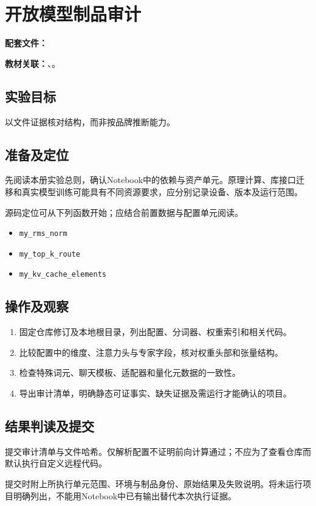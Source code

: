 \chapter{开放模型制品审计}
\label{lab:E10_open_model}

\noindent\textbf{配套文件：}\par
\noindent\textbf{教材关联：}、。

\section*{实验目标}
以文件证据核对结构，而非按品牌推断能力。

\section*{准备及定位}
先阅读本册实验总则，确认Notebook中的依赖与资产单元。原理计算、库接口迁移和真实模型训练可能具有不同资源要求，应分别记录设备、版本及运行范围。

源码定位可从下列函数开始；应结合前置数据与配置单元阅读。
\begin{itemize}
\item \texttt{my\_rms\_norm}
\item \texttt{my\_top\_k\_route}
\item \texttt{my\_kv\_cache\_elements}
\end{itemize}

\section*{操作及观察}
\begin{enumerate}
\item 固定仓库修订及本地根目录，列出配置、分词器、权重索引和相关代码。
\item 比较配置中的维度、注意力头与专家字段，核对权重头部和张量结构。
\item 检查特殊词元、聊天模板、适配器和量化元数据的一致性。
\item 导出审计清单，明确静态可证事实、缺失证据及需运行才能确认的项目。
\end{enumerate}

\section*{结果判读及提交}
提交审计清单与文件哈希。仅解析配置不证明前向计算通过；不应为了查看仓库而默认执行自定义远程代码。

提交时附上所执行单元范围、环境与制品身份、原始结果及失败说明。将未运行项目明确列出，不能用Notebook中已有输出替代本次执行证据。
